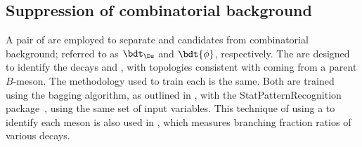 






\subsection{Suppression of combinatorial background}
A pair of  are employed to
separate \dstokkpi and \phitokk candidates from combinatorial background; referred to as
$\bdt_{\Ds}$ and $\bdt{\phi}$, respectively.
The  are designed to identify the
decays \dstokkpi and \phitokk, with topologies consistent with coming from a parent $B$-meson.
The methodology used to train each \bdt is the same.
Both are trained using the bagging algorithm, as outlined in , with the
StatPatternRecognition package~\cite{Narsky:2005xpa}, using the same set of
input variables.
This technique of using a \bdt to identify each meson is also used in
, which measures branching fraction ratios of various  decays.

